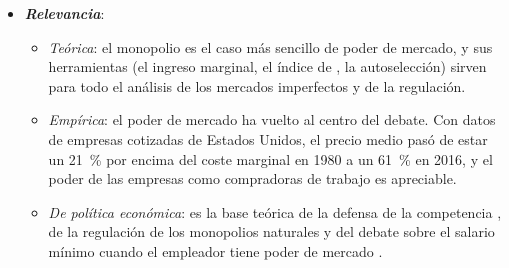\documentclass[11pt]{article}
\begin{document}
\begin{itemize}
\begin{itemize}
  \item El  (del griego \emph{mónos}, uno, y \emph{pōleîn}, vender) es la estructura de mercado con un único vendedor de un bien sin sustitutivos cercanos, protegido por barreras de entrada. Su rasgo esencial es el : la capacidad de fijar un precio por encima del coste marginal sin perder todas las ventas. Como la empresa deja de ser precio-aceptante, falla un supuesto del primer teorema fundamental de la economía del bienestar (1TFEB), y el equilibrio deja de ser eficiente .
  \item Su simétrico en el lado de la compra es el , un único comprador, y, cuando un monopolista se enfrenta a un monopsonista, hablamos de .
  \end{itemize}

\item \textbf{\emph{Relevancia}}:
  \begin{itemize}
  \item \emph{Teórica}: el monopolio es el caso más sencillo de poder de mercado, y sus herramientas (el ingreso marginal, el índice de , la autoselección) sirven para todo el análisis de los mercados imperfectos y de la regulación.
  \item \emph{Empírica}: el poder de mercado ha vuelto al centro del debate. Con datos de empresas cotizadas de Estados Unidos, el precio medio pasó de estar un 21~\% por encima del coste marginal en 1980 a un 61~\% en 2016\nocite{DeLoeckerEeckhoutUnger2020Rise}, y el poder de las empresas como compradoras de trabajo es apreciable\nocite{YehMacalusoHershbein2022Monopsony}.
  \item \emph{De política económica}: es la base teórica de la defensa de la competencia  , de la regulación de los monopolios naturales  y del debate sobre el salario mínimo cuando el empleador tiene poder de mercado .
  \end{itemize}


\end{itemize}
\end{document}

